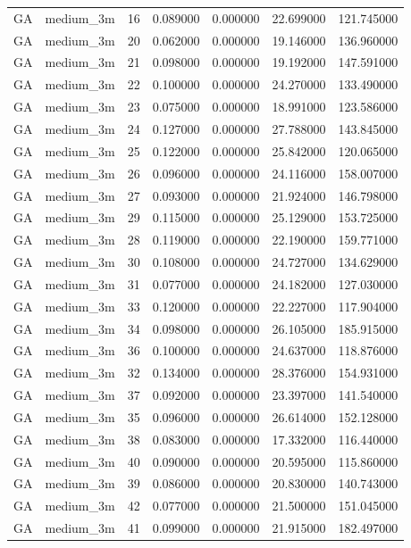 \begin{tabular}{llrrrrr}
GA & medium_3m & 16 & 0.089000 & 0.000000 & 22.699000 & 121.745000 \\
GA & medium_3m & 20 & 0.062000 & 0.000000 & 19.146000 & 136.960000 \\
GA & medium_3m & 21 & 0.098000 & 0.000000 & 19.192000 & 147.591000 \\
GA & medium_3m & 22 & 0.100000 & 0.000000 & 24.270000 & 133.490000 \\
GA & medium_3m & 23 & 0.075000 & 0.000000 & 18.991000 & 123.586000 \\
GA & medium_3m & 24 & 0.127000 & 0.000000 & 27.788000 & 143.845000 \\
GA & medium_3m & 25 & 0.122000 & 0.000000 & 25.842000 & 120.065000 \\
GA & medium_3m & 26 & 0.096000 & 0.000000 & 24.116000 & 158.007000 \\
GA & medium_3m & 27 & 0.093000 & 0.000000 & 21.924000 & 146.798000 \\
GA & medium_3m & 29 & 0.115000 & 0.000000 & 25.129000 & 153.725000 \\
GA & medium_3m & 28 & 0.119000 & 0.000000 & 22.190000 & 159.771000 \\
GA & medium_3m & 30 & 0.108000 & 0.000000 & 24.727000 & 134.629000 \\
GA & medium_3m & 31 & 0.077000 & 0.000000 & 24.182000 & 127.030000 \\
GA & medium_3m & 33 & 0.120000 & 0.000000 & 22.227000 & 117.904000 \\
GA & medium_3m & 34 & 0.098000 & 0.000000 & 26.105000 & 185.915000 \\
GA & medium_3m & 36 & 0.100000 & 0.000000 & 24.637000 & 118.876000 \\
GA & medium_3m & 32 & 0.134000 & 0.000000 & 28.376000 & 154.931000 \\
GA & medium_3m & 37 & 0.092000 & 0.000000 & 23.397000 & 141.540000 \\
GA & medium_3m & 35 & 0.096000 & 0.000000 & 26.614000 & 152.128000 \\
GA & medium_3m & 38 & 0.083000 & 0.000000 & 17.332000 & 116.440000 \\
GA & medium_3m & 40 & 0.090000 & 0.000000 & 20.595000 & 115.860000 \\
GA & medium_3m & 39 & 0.086000 & 0.000000 & 20.830000 & 140.743000 \\
GA & medium_3m & 42 & 0.077000 & 0.000000 & 21.500000 & 151.045000 \\
GA & medium_3m & 41 & 0.099000 & 0.000000 & 21.915000 & 182.497000 \\

\end{tabular}

